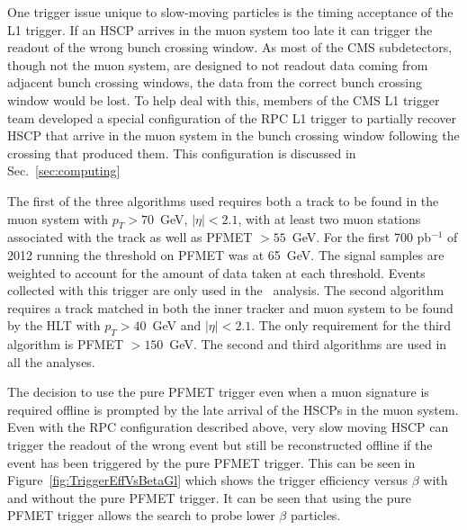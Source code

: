 One trigger issue unique to slow-moving particles is the timing acceptance of the L1 trigger. If an HSCP arrives in the muon system too late it can trigger the
readout of the wrong bunch crossing window. As most of the CMS subdetectors, though not the muon system, are designed to not readout data coming from adjacent bunch crossing windows,
the data from the correct bunch crossing window would be lost. To help deal with this, members of the CMS L1 trigger team developed a special configuration of the
RPC L1 trigger to partially recover HSCP that arrive in the muon system in the bunch crossing window following the crossing that produced them.
This configuration is discussed in Sec.~\ref{sec:computing}


The first of the three algorithms used requires both a track to be found in the muon system with $p_T > 70$~GeV, $|\eta| < 2.1$, with at least two
muon stations associated with the track as well as PFMET $ > 55$~GeV. 
For the first 700 pb$^{-1}$ of 2012 running the threshold on PFMET was at 65~GeV. The signal samples are weighted
to account for the amount of data taken at each threshold. Events collected with this trigger are only used
in the \muononly\ analysis.
The second algorithm requires a track matched in both the inner tracker
and muon system to be found by the HLT with $p_T > 40$~GeV and $|\eta| < 2.1$. The only requirement for the third algorithm is PFMET $ > 150$~GeV.
The second and third algorithms are used in all the analyses.

The decision to use the pure PFMET trigger even when a muon signature is required offline is prompted by the late arrival of the HSCPs in the muon system.
Even with the RPC configuration described above, very slow moving HSCP can trigger the readout of the wrong event but still be reconstructed offline
if the event has been triggered by the pure PFMET trigger. This can be seen in Figure~\ref{fig:TriggerEffVsBetaGl} which shows the trigger efficiency versus $\beta$
with and without the pure PFMET trigger.
It can be seen that using the pure PFMET trigger allows the search to probe lower $\beta$ particles. 

